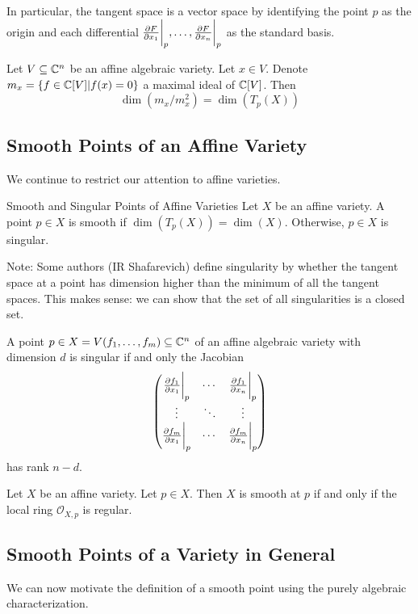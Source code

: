 \documentclass[a4paper]{article}
\begin{document}
In particular, the tangent space is a vector space by identifying the point $p$ as the origin and each differential $\frac{\partial F}{\partial x_1}\bigg{|}_p,\dots,\frac{\partial F}{\partial x_n}\bigg{|}_p$ as the standard basis. 

\begin{prp}{}{} Let $V\subseteq\mathbb{C}^n$ be an affine algebraic variety. Let $x\in V$. Denote $m_x=\{f\in\mathbb{C}[V]|f(x)=0\}$ a maximal ideal of $\mathbb{C}[V]$. Then $$\dim(m_x/m_x^2)=\dim(T_p(X))$$
\end{prp}

\subsection{Smooth Points of an Affine Variety}
We continue to restrict our attention to affine varieties. 

\begin{defn}{Smooth and Singular Points of Affine Varieties}{} Let $X$ be an affine variety. A point $p\in X$ is smooth if $\dim(T_p(X))=\dim(X)$. Otherwise, $p\in X$ is singular. 
\end{defn}

Note: Some authors (IR Shafarevich) define singularity by whether the tangent space at a point has dimension higher than the minimum of all the tangent spaces. This makes sense: we can show that the set of all singularities is a closed set. 

\begin{prp}{}{} A point $p\in X=V(f_1,\dots,f_m)\subseteq\mathbb{C}^n$ of an affine algebraic variety with dimension $d$ is singular if and only the Jacobian $$\begin{pmatrix}
\frac{\partial f_1}{\partial x_1}\bigg{|}_p & \cdots & \frac{\partial f_1}{\partial x_n}\bigg{|}_p\\
\vdots & \ddots & \vdots\\
\frac{\partial f_m}{\partial x_1}\bigg{|}_p & \cdots & \frac{\partial f_m}{\partial x_n}\bigg{|}_p
\end{pmatrix}$$
has rank $n-d$. 
\end{prp}

\begin{prp}{}{} Let $X$ be an affine variety. Let $p\in X$. Then $X$ is smooth at $p$ if and only if the local ring $\mathcal{O}_{X,p}$ is regular. 
\end{prp}

\subsection{Smooth Points of a Variety in General}
We can now motivate the definition of a smooth point using the purely algebraic characterization. 
\end{document}
